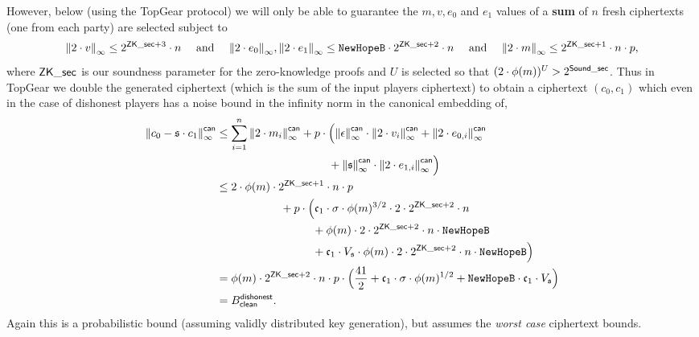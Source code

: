 \noindent
However, below (using the TopGear protocol)
we will only be able to guarantee the $m, v, e_0$ and $e_1$ 
values of a {\bf sum} of $n$ fresh ciphertexts
(one from each party) are selected subject to
\[ {\Vert 2 \cdot v \Vert}_\infty \le 2^{\mathsf{ZK\_sec} + 3} \cdot n \quad 
    \mbox{  and  } \quad
   {\Vert 2 \cdot e_0 \Vert}_\infty, {\Vert 2 \cdot e_1 \Vert}_\infty \le \texttt{NewHopeB} \cdot 2^{\mathsf{ZK\_sec} + 2} \cdot n \quad
    \mbox{  and  } \quad
   {\Vert 2 \cdot m \Vert}_\infty \le 2^{\mathsf{ZK\_sec} + 1} \cdot n \cdot p,
\]
where $\mathsf{ZK\_sec}$ is our soundness parameter for the 
zero-knowledge proofs and $U$ is selected so that 
$(2 \cdot \phi(m))^U > 2^{\mathsf{Sound\_sec}}$.
Thus in TopGear we double the generated ciphertext 
(which is the sum of the input players ciphertext)
to obtain a ciphertext $(c_0,c_1)$ which even in the
case of dishonest players has a noise bound in the
infinity norm in the canonical embedding of,
\begin{align*}
  \norm{c_0 - \sk \cdot c_1}_\infty^\can
  &\le \sum_{i=1}^n
  	\norm{2 \cdot m_i}_\infty^\can
	+ p \cdot \Big(\norm{\epsilon}_\infty^\can \cdot \norm{2 \cdot v_i}_\infty^\can 
	+ \norm{2 \cdot e_{0,i}}_\infty^\can \\
  &\hspace{3.5cm}
	+ \norm{\sk}_\infty^\can \cdot \norm{2 \cdot e_{1,i}}_\infty^\can \Big) \\
   &\le 2 \cdot \phi(m) \cdot 2^{\ZKsecp+1} \cdot n \cdot p  \\
   & \hspace{2cm}
	+ p \cdot \Big(
	 \gc_1 \cdot \sigma \cdot \phi(m)^{3/2} \cdot 2 \cdot 2^{\ZKsecp+2} \cdot n\\
  &\hspace{3cm}
	  + \phi(m) \cdot 2 \cdot  2^{\ZKsecp+2} \cdot n \cdot \texttt{NewHopeB}  \\
  &\hspace{3cm}
	  +  \gc_1 \cdot V_\sk \cdot \phi(m) \cdot 2 \cdot 2^{\ZKsecp+2} \cdot n \cdot \texttt{NewHopeB} 
	\Big)  \\
  &=\phi(m) \cdot 2^{\ZKsecp+2} \cdot n \cdot p
	\cdot \Big( \frac{41}{2} + \gc_1 \cdot \sigma \cdot \phi(m)^{1/2}  
	           +  \texttt{NewHopeB} \cdot \gc_1 \cdot V_\sk
	\Big)   \\
  & = B_\clean^\dishonest.
\end{align*}
Again this is a probabilistic bound (assuming validly
distributed key generation), but assumes the {\em worst case}
ciphertext bounds.

